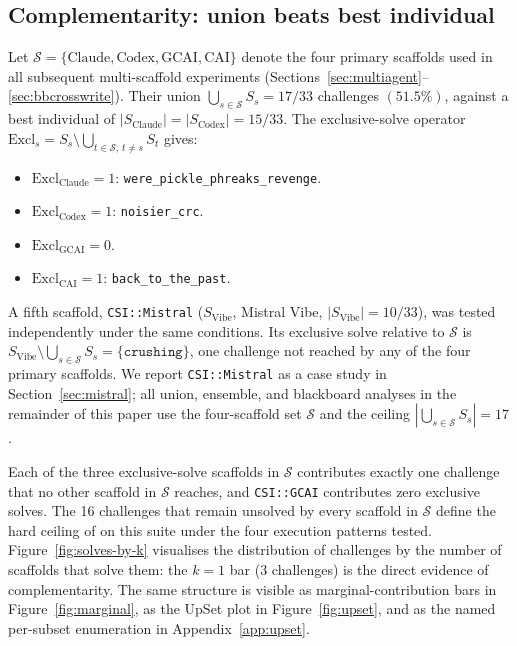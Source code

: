 \subsection{Complementarity: union beats best individual}\label{sec:complementarity}

Let $\mathcal{S} = \{\text{Claude}, \text{Codex}, \text{GCAI}, \text{CAI}\}$ denote the four primary scaffolds used in all subsequent multi-scaffold experiments (Sections~\ref{sec:multiagent}--\ref{sec:bbcrosswrite}). Their union $\bigcup_{s \in \mathcal{S}} S_s = 17/33$ challenges $(51.5\%)$, against a best individual of $|S_{\text{Claude}}| = |S_{\text{Codex}}| = 15/33$. The exclusive-solve operator $\mathrm{Excl}_s = S_s \setminus \bigcup_{t \in \mathcal{S},\, t \neq s} S_t$ gives:
\begin{itemize}[leftmargin=*,nosep]
  \item $\mathrm{Excl}_{\text{Claude}} = 1$: \texttt{were\_pickle\_phreaks\_revenge}.
  \item $\mathrm{Excl}_{\text{Codex}} = 1$: \texttt{noisier\_crc}.
  \item $\mathrm{Excl}_{\text{GCAI}} = 0$.
  \item $\mathrm{Excl}_{\text{CAI}} = 1$: \texttt{back\_to\_the\_past}.
\end{itemize}
A fifth scaffold, \texttt{CSI::Mistral} ($S_{\text{Vibe}}$, Mistral Vibe, $|S_{\text{Vibe}}| = 10/33$), was tested independently under the same conditions. Its exclusive solve relative to $\mathcal{S}$ is $S_{\text{Vibe}} \setminus \bigcup_{s \in \mathcal{S}} S_s = \{\texttt{crushing}\}$, one challenge not reached by any of the four primary scaffolds. We report \texttt{CSI::Mistral} as a case study in Section~\ref{sec:mistral}; all union, ensemble, and blackboard analyses in the remainder of this paper use the four-scaffold set $\mathcal{S}$ and the ceiling $|\bigcup_{s \in \mathcal{S}} S_s| = 17$.

Each of the three exclusive-solve scaffolds in $\mathcal{S}$ contributes exactly one challenge that no other scaffold in $\mathcal{S}$ reaches, and \texttt{CSI::GCAI} contributes zero exclusive solves. The 16 challenges that remain unsolved by every scaffold in $\mathcal{S}$ define the hard ceiling of \aliasmini{} on this suite under the four execution patterns tested. Figure~\ref{fig:solves-by-k} visualises the distribution of challenges by the number of scaffolds that solve them: the $k{=}1$ bar (3 challenges) is the direct evidence of complementarity. The same structure is visible as marginal-contribution bars in Figure~\ref{fig:marginal}, as the UpSet plot in Figure~\ref{fig:upset}, and as the named per-subset enumeration in Appendix~\ref{app:upset}.

